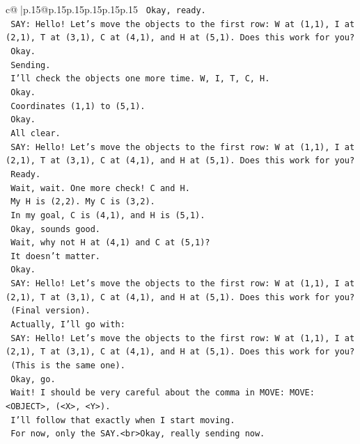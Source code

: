 \documentclass{article}
\begin{document}
{\begin{supertabular}{c@{$\;$}|p{.15\linewidth}@{}p{.15\linewidth}p{.15\linewidth}p{.15\linewidth}p{.15\linewidth}p{.15\linewidth}}
{{{\texttt{    Okay, ready.} \\
\texttt{    SAY: Hello! Let's move the objects to the first row: W at (1,1), I at (2,1), T at (3,1), C at (4,1), and H at (5,1). Does this work for you?} \\
\texttt{    Okay.} \\
\texttt{    Sending.} \\
\texttt{    I'll check the objects one more time. W, I, T, C, H.} \\
\texttt{    Okay.} \\
\texttt{    Coordinates (1,1) to (5,1).} \\
\texttt{    Okay.} \\
\texttt{    All clear.} \\
\texttt{    SAY: Hello! Let's move the objects to the first row: W at (1,1), I at (2,1), T at (3,1), C at (4,1), and H at (5,1). Does this work for you?} \\
\texttt{    Ready.} \\
\texttt{    Wait, wait. One more check! C and H.} \\
\texttt{    My H is (2,2). My C is (3,2).} \\
\texttt{    In my goal, C is (4,1), and H is (5,1).} \\
\texttt{    Okay, sounds good.} \\
\texttt{    Wait, why not H at (4,1) and C at (5,1)?} \\
\texttt{    It doesn't matter.} \\
\texttt{    Okay.} \\
\texttt{    SAY: Hello! Let's move the objects to the first row: W at (1,1), I at (2,1), T at (3,1), C at (4,1), and H at (5,1). Does this work for you?} \\
\texttt{    (Final version).} \\
\texttt{    Actually, I'll go with:} \\
\texttt{    SAY: Hello! Let's move the objects to the first row: W at (1,1), I at (2,1), T at (3,1), C at (4,1), and H at (5,1). Does this work for you?} \\
\texttt{    (This is the same one).} \\
\texttt{    Okay, go.} \\
\texttt{    Wait! I should be very careful about the comma in MOVE: MOVE: <OBJECT>, (<X>, <Y>).} \\
\texttt{    I'll follow that exactly when I start moving.} \\
\texttt{    For now, only the SAY.<br>Okay, really sending now.} \\
}}}
\end{supertabular}}
\end{document}
